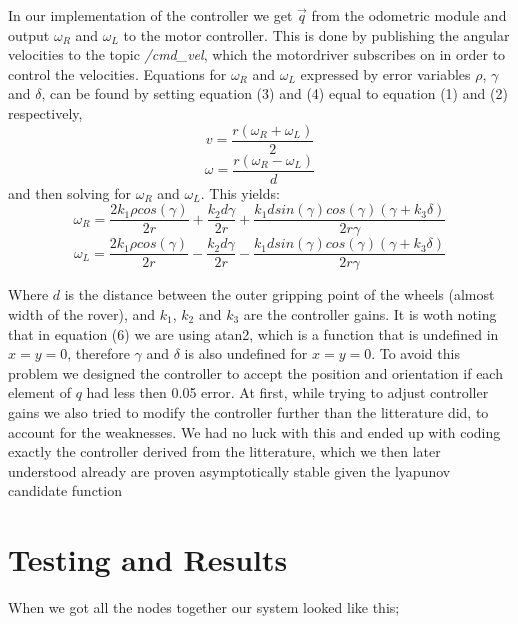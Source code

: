 \documentclass[a4paper,10pt]{article}
\begin{document}
		In our implementation of the controller we get $\vec{q}$ from the odometric module and output $\omega_{R}$ and $\omega_{L}$ to the motor controller. 
		This is done by publishing the angular velocities to the topic \textit{/cmd\_vel}, which the motordriver subscribes on in order to control the velocities.
		Equations for $\omega_{R}$ and $\omega_{L}$ expressed by error variables $\rho$, $\gamma$ and $\delta$, can be found
		by setting equation (3) and (4) equal to equation (1) and (2) respectively, 
		\begin{equation}
			v = \frac{r(\omega_{R} + \omega_{L})}{2}
		\end{equation}
		\begin{equation}
			\omega = \frac{r(\omega_{R} - \omega_{L})}{d}
		\end{equation}
		and then solving for $\omega_{R}$ and $\omega_{L}$. This yields:		
		\begin{equation}
			\omega_{R} = \frac{2k_{1}\rho cos(\gamma)}{2r} + \frac{k_{2}d\gamma}{2r} + \frac{k_{1}dsin(\gamma)cos(\gamma)(\gamma + k_{3}\delta)}{2r\gamma}
		\end{equation}
		\begin{equation}
			\omega_{L} = \frac{2k_{1}\rho cos(\gamma)}{2r} - \frac{k_{2}d\gamma}{2r} - \frac{k_{1}dsin(\gamma)cos(\gamma)(\gamma + k_{3}\delta)}{2r\gamma}
		\end{equation}

		Where $d$ is the distance between the outer gripping point of the wheels (almost width of the rover), and $k_{1}$, $k_{2}$ and $k_{3}$ are the controller gains.
		It is woth noting that in equation (6) we are using atan2, which is a function that is undefined in $x=y=0$, therefore $\gamma$ and $\delta$ is also undefined for $x=y=0$.
		To avoid this problem we designed the controller to accept the position and orientation if each element of $q$ had less then 0.05 error. At first, while trying to adjust controller gains 
		we also tried to modify the controller further than the litterature did, to account for the weaknesses. We had no luck with this and ended up with coding exactly the controller
		derived from the litterature, which we then later understood already are proven asymptotically stable given the lyapunov candidate function

\section{Testing and Results}

		When we got all the nodes together our system looked like this;
\end{document}
